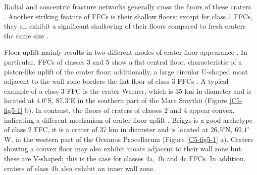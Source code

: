 Radial and concentric fracture networks  generally cross the floors of
these  craters \citep{Schultz:1976kt}.   Another  striking feature  of
FFCs  is their  shallow  floors: except  for class  1  FFCs, they  all
exhibit a  significant shallowing  of their  floors compared  to fresh
craters the same size \citep{Schultz:1976kt,Jozwiak:2012dq}.
	
Floor uplift  mainly results  in two different  modes of  crater floor
appearance \citep{Schultz:1976kt}.   In particular, FFCs of  classes 3
and  5 show  a flat  central  floor, characteristic  of a  piston-like
uplift of  the crater floor;  additionally, a large  circular U-shaped
moat adjacent to the wall zone borders  the flat floor of class 3 FFCs
\citep{Schultz:1976kt,Jozwiak:2012dq}. A typical example  of a class 3
FFC is the crater Warner, which is 35 km in diameter and is located at
$4.0^{\circ}$S,  $87.3^{\circ}$E  in the  southern  part  of the  Mare
Smythii (Figure \ref{C5-fig5-1} b). In contrast, the floors of craters
of classes 2 and 4 appear  convex, indicating a different mechanism of
crater floor uplift  \citep{Schultz:1976kt,Jozwiak:2012dq}.  Briggs is
a good archetype of  class 2 FFC, it is a crater of  37 km in diameter
and  is located  at $26.5^{\circ}$N,  $69.1^{\circ}$W, in  the western
part of  the Oceanus  Procellarum (Figure \ref{C5-fig5-1}  a). Craters
showing a convex  floor may also exhibit moats adjacent  to their wall
zone but these are  V-shaped; this is the case for  classes 4a, 4b and
4c FFCs. In  addition, craters of class 4b also  exhibit an inner wall
zone.



